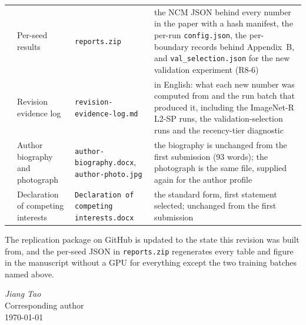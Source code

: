 \begin{center}
\begin{longtable}{@{}>{\raggedright\arraybackslash}p{0.6cm}>{\raggedright\arraybackslash}p{4.0cm}>{\raggedright\arraybackslash}p{4.4cm}>{\raggedright\arraybackslash}p{4.4cm}@{}}
\addlinespace
9 & Per-seed results & \texttt{reports.zip} & the NCM JSON behind every number in the paper
with a hash manifest, the per-run \texttt{config.json}, the per-boundary records behind
Appendix~B, and \texttt{val\_selection.json} for the new validation experiment (R8-6) \\
\addlinespace
10 & Revision evidence log & \texttt{revision-evidence-\allowbreak log.md} & in English: what each new
number was computed from and the run batch that produced it, including the ImageNet-R L2-SP
runs, the validation-selection runs and the recency-tier diagnostic \\
\addlinespace
11 & Author biography and photograph & \texttt{author-biography.docx},
\texttt{author-photo.jpg} & the biography is unchanged from the first submission (93 words);
the photograph is the same file, supplied again for the author profile \\
\addlinespace
12 & Declaration of competing interests & \texttt{Declaration of competing
interests.docx} & the standard form, first statement selected; unchanged from the first
submission \\
\bottomrule
\end{longtable}
\end{center}

\vspace{6pt}

\noindent The replication package on GitHub is updated to the state this revision was built
from, and the per-seed JSON in \texttt{reports.zip} regenerates every table and figure in the
manuscript without a GPU for everything except the two training batches named above.

\vspace{6pt}

\noindent\emph{Jiang Tao}\\
Corresponding author\\
\today
